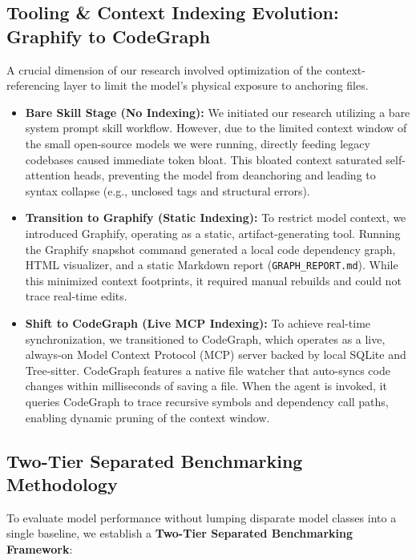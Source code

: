 \documentclass[10pt,journal,compsoc]{IEEEtran}
\begin{document}
\subsection{Tooling \& Context Indexing Evolution: Graphify to CodeGraph}
A crucial dimension of our research involved optimization of the context-referencing layer to limit the model's physical exposure to anchoring files. 
\begin{itemize}
    \item \textbf{Bare Skill Stage (No Indexing):} We initiated our research utilizing a bare system prompt skill workflow. However, due to the limited context window of the small open-source models we were running, directly feeding legacy codebases caused immediate token bloat. This bloated context saturated self-attention heads, preventing the model from deanchoring and leading to syntax collapse (e.g., unclosed tags and structural errors).
    
    \item \textbf{Transition to Graphify (Static Indexing):} To restrict model context, we introduced Graphify, operating as a static, artifact-generating tool. Running the Graphify snapshot command generated a local code dependency graph, HTML visualizer, and a static Markdown report (\texttt{GRAPH\_REPORT.md}). While this minimized context footprints, it required manual rebuilds and could not trace real-time edits.
    
    \item \textbf{Shift to CodeGraph (Live MCP Indexing):} To achieve real-time synchronization, we transitioned to CodeGraph, which operates as a live, always-on Model Context Protocol (MCP) server backed by local SQLite and Tree-sitter. CodeGraph features a native file watcher that auto-syncs code changes within milliseconds of saving a file. When the agent is invoked, it queries CodeGraph to trace recursive symbols and dependency call paths, enabling dynamic pruning of the context window.
\end{itemize}

\subsection{Two-Tier Separated Benchmarking Methodology}
To evaluate model performance without lumping disparate model classes into a single baseline, we establish a \textbf{Two-Tier Separated Benchmarking Framework}:
\end{document}
